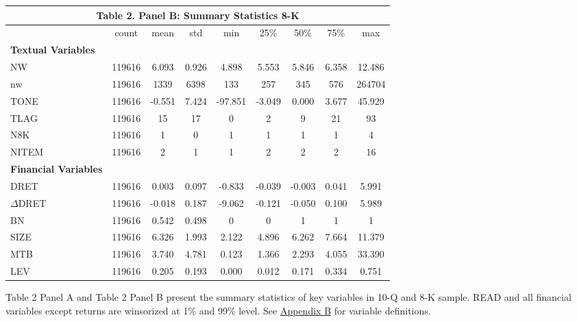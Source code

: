 \begin{table}[H] \label{T2PB}
  \begin{center}
  	    \begin{tabular}{lcccccccc}
  		\multicolumn{9}{c}{\textbf{Table 2. Panel B: Summary Statistics 8-K}} \\
  		\midrule
  		\midrule
  		& count & mean & std & min & 25\% & 50\% & 75\% & max \\
  		\midrule
  		\textbf{Textual Variables} &   &   &   &   &   &   &   &  \\
  		NW & 119616 & 6.093 & 0.926 & 4.898 & 5.553 & 5.846 & 6.358 & 12.486 \\
  		nw & 119616 & 1339 & 6398 & 133 & 257 & 345 & 576 & 264704 \\
  		TONE & 119616 & -0.551 & 7.424 & -97.851 & -3.049 & 0.000 & 3.677 & 45.929 \\
  		TLAG & 119616 & 15 & 17 & 0 & 2 & 9 & 21 & 93 \\
  		N8K & 119616 & 1 & 0 & 1 & 1 & 1 & 1 & 4 \\
  		NITEM & 119616 & 2 & 1 & 1 & 2 & 2 & 2 & 16 \\
  		
  		\textbf{Financial Variables} &   &   &   &   &   &   &   &  \\
  		DRET & 119616 & 0.003 & 0.097 & -0.833 & -0.039 & -0.003 & 0.041 & 5.991 \\
  		$\Delta$DRET & 119616 & -0.018 & 0.187 & -9.062 & -0.121 & -0.050 & 0.100 & 5.989 \\
  		BN & 119616 & 0.542 & 0.498 & 0 & 0 & 1 & 1 & 1 \\
  		SIZE & 119616 & 6.326 & 1.993 & 2.122 & 4.896 & 6.262 & 7.664 & 11.379 \\
  		MTB & 119616 & 3.740 & 4.781 & 0.123 & 1.366 & 2.293 & 4.055 & 33.390 \\
  		LEV & 119616 & 0.205 & 0.193 & 0.000 & 0.012 & 0.171 & 0.334 & 0.751 \\
  		\bottomrule
  		\bottomrule
  	\end{tabular}%
  \end{center}
	\begin{footnotesize}
		\noindent Table 2 Panel A and Table 2 Panel B present the summary statistics of key variables in 10-Q and 8-K sample. READ and all financial variables except returns are winsorized at 1\% and 99\% level. See \hyperref[appb]{Appendix B} for variable definitions.
	\end{footnotesize}
\end{table}%